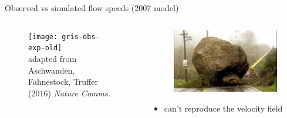 \documentclass[hide notes,intlimits]{beamer}
\begin{document}
\begin{frame}{Observed vs simulated flow speeds (2007 model)}
  \begin{columns}[c]
    \begin{column}{.6\linewidth}
    \begin{figure}
      \texttt{[image: gris-obs-exp-old]}
      \\ \tiny{adapted from Aschwanden, Fahnestock, Truffer (2016) \textit{Nature Comms.}}
    \end{figure}
    \end{column}
    \begin{column}{.4\linewidth}
      \begin{figure}
        \includegraphics[width=.75\textwidth]{roadblocks}
      \end{figure}
      \begin{itemize}
      \item can't reproduce the velocity field
      \end{itemize}
    \end{column}
  \end{columns}
  \note[item]{}
\end{frame}
\end{document}
